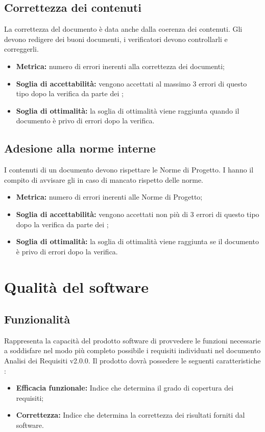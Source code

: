 \subsection{Correttezza dei contenuti}
La correttezza del documento è data anche dalla coerenza dei contenuti. Gli  devono redigere dei buoni documenti, i verificatori devono controllarli e correggerli.
\begin{itemize}
    \item \textbf{Metrica:} numero di errori inerenti alla correttezza dei documenti;
    \item \textbf{Soglia di accettabilità:} vengono accettati al massimo 3 errori di questo tipo dopo la verifica da parte dei ;
    \item \textbf{Soglia di ottimalità:} la soglia di ottimalità viene raggiunta quando il documento è privo di errori dopo la verifica.
\end{itemize}
\subsection{Adesione alla norme interne}
I contenuti di un documento devono rispettare le Norme di Progetto. I  hanno il compito di avvisare gli  in caso di mancato rispetto delle norme.
\begin{itemize}
    \item \textbf{Metrica:} numero di errori inerenti alle Norme di Progetto;
    \item \textbf{Soglia di accettabilità:} vengono accettati non più di 3 errori di questo tipo dopo la verifica da parte dei ;
    \item \textbf{Soglia di ottimalità:} la soglia di ottimalità viene raggiunta se il documento è privo di errori dopo la verifica.
\end{itemize}

\section{Qualità del software}

\subsection{Funzionalità}
Rappresenta la capacità del prodotto software di provvedere le funzioni necessarie a soddisfare  nel modo più completo possibile i requisiti individuati nel documento Analisi dei Requisiti v2.0.0. Il prodotto dovrà possedere le seguenti caratteristiche :
\begin{itemize}
	\item \textbf{Efficacia funzionale:} Indice che determina il grado di copertura dei requisiti;
	\item \textbf{Correttezza:} Indice che determina la correttezza dei risultati forniti dal software.
\end{itemize}

